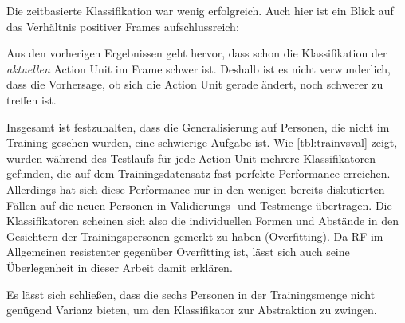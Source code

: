 Die zeitbasierte Klassifikation war wenig erfolgreich. Auch hier ist ein Blick
auf das Verhältnis positiver Frames aufschlussreich:

Aus den vorherigen Ergebnissen geht hervor, dass schon die Klassifikation der
\emph{aktuellen} Action Unit im Frame schwer ist. Deshalb ist es nicht verwunderlich,
dass die Vorhersage, ob sich die Action Unit gerade ändert, noch schwerer zu
treffen ist.

Insgesamt ist festzuhalten, dass die Generalisierung auf Personen, die nicht im
Training gesehen wurden, eine schwierige Aufgabe ist. Wie \cref{tbl:trainvsval}
zeigt, wurden während des Testlaufs für jede Action Unit mehrere Klassifikatoren
gefunden, die auf dem Trainingsdatensatz fast perfekte Performance erreichen.
Allerdings hat sich diese Performance nur in den wenigen bereits diskutierten Fällen
auf die neuen Personen in Validierungs- und Testmenge übertragen. Die
Klassifikatoren scheinen sich also die individuellen Formen und Abstände in den Gesichtern
der Trainingspersonen gemerkt zu haben (Overfitting). Da RF im Allgemeinen resistenter gegenüber Overfitting ist, lässt sich auch seine Überlegenheit in dieser Arbeit damit erklären.

Es lässt sich schließen,
dass die sechs Personen in der Trainingsmenge nicht genügend Varianz bieten, um
den Klassifikator zur Abstraktion zu zwingen.



